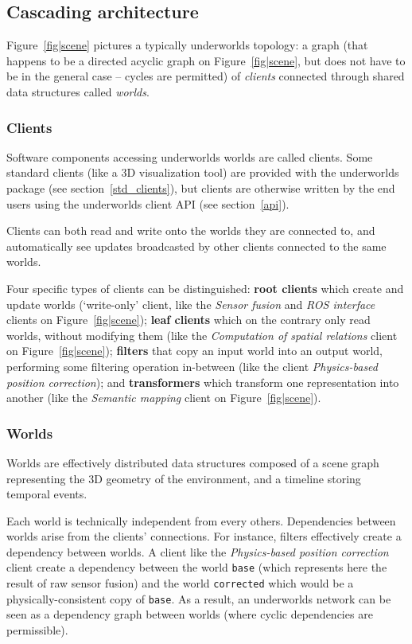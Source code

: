 \documentclass[letterpaper, 10 pt, conference]{ieeeconf}  %
\newcommand{\uwds}{{\sc underworlds}\xspace}
\begin{document}
\subsection{Cascading architecture}

Figure~\ref{fig|scene} pictures a typically \uwds topology: a graph (that
happens to be a directed acyclic graph on Figure~\ref{fig|scene}, but does not
have to be in the general case -- cycles are permitted) of \emph{clients}
connected through shared data structures called \emph{worlds}.

\subsubsection{Clients}

Software components accessing \uwds worlds are called clients. Some standard
clients (like a 3D visualization tool) are provided with the \uwds package (see
section~\ref{std_clients}), but clients are otherwise written by the end users
using the \uwds client API (see section~\ref{api}).

Clients can both read and write onto the worlds they are connected to, and
automatically see updates broadcasted by other clients connected to the same
worlds.

Four specific types of clients can be distinguished: \textbf{root clients} which
create and update worlds (`write-only' client, like the \emph{Sensor fusion} and
\emph{ROS interface} clients on Figure~\ref{fig|scene}); \textbf{leaf clients}
which on the contrary only read worlds, without modifying them (like the
\emph{Computation of spatial relations} client on Figure~\ref{fig|scene});
\textbf{filters} that copy an input world into an output world, performing
some filtering operation in-between (like the client \textit{Physics-based
position correction}); and \textbf{transformers} which transform one
representation into another (like the \emph{Semantic mapping} client on
Figure~\ref{fig|scene}).

\subsubsection{Worlds}

Worlds are effectively distributed data structures composed of a scene graph
representing the 3D geometry of the environment, and a timeline storing temporal
events.

Each world is technically independent from every others. Dependencies between
worlds arise from the clients' connections. For instance, filters effectively
create a dependency between worlds. A client like the \textit{Physics-based
position correction} client create a dependency between the world {\tt base} (which
represents here the result of raw sensor fusion) and the world {\tt corrected}
which would be a physically-consistent copy of {\tt base}.
As a result, an \uwds network can be seen as a dependency graph between worlds (where
cyclic dependencies are permissible).
\end{document}
